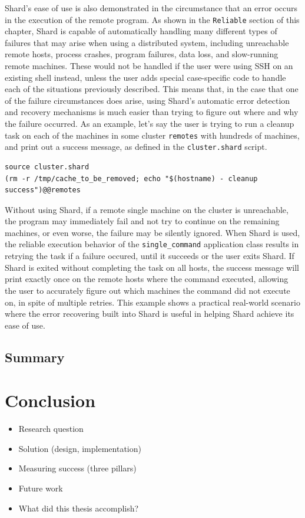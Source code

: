 \documentclass[twoside]{report}
\newcommand{\todoi}[1]{\todo[inline, color=blue!20]{TODO: {#1}}}
\begin{document}
Shard's ease of use is also demonstrated in the circumstance that an error occurs in the execution of the remote program.
As shown in the \texttt{Reliable} section of this chapter, Shard is capable of automatically handling many different types of failures that may arise when using a distributed system, including unreachable remote hosts, process crashes, program failures, data loss, and slow-running remote machines.
These would not be handled if the user were using SSH on an existing shell instead, unless the user adds special case-specific code to handle each of the situations previously described.
This means that, in the case that one of the failure circumstances does arise, using Shard's automatic error detection and recovery mechanisms is much easier than trying to figure out where and why the failure occurred.
As an example, let's say the user is trying to run a cleanup task on each of the machines in some cluster \texttt{remotes} with hundreds of machines, and print out a success message, as defined in the \texttt{cluster.shard} script.
\begin{lstlisting}[language=Shard]
source cluster.shard
(rm -r /tmp/cache_to_be_removed; echo "$(hostname) - cleanup success")@@remotes
\end{lstlisting}
Without using Shard, if a remote single machine on the cluster is unreachable, the program may immediately fail and not try to continue on the remaining machines, or even worse, the failure may be silently ignored.
When Shard is used, the reliable execution behavior of the \texttt{single\_command} application class results in retrying the task if a failure occured, until it succeeds or the user exits Shard.
If Shard is exited without completing the task on all hosts, the success message will print exactly once on the remote hosts where the command executed, allowing the user to accurately figure out which machines the command did not execute on, in spite of multiple retries.
This example shows a practical real-world scenario where the error recovering built into Shard is useful in helping Shard achieve its ease of use.

\section{Summary}
\todoi{Write a summary for the evaluation chapter}

\chapter{Conclusion}
\begin{itemize}
  \item Research question
  \item Solution (design, implementation)
  \item Measuring success (three pillars)
  \item Future work
  \item What did this thesis accomplish?
\end{itemize}
\end{document}
